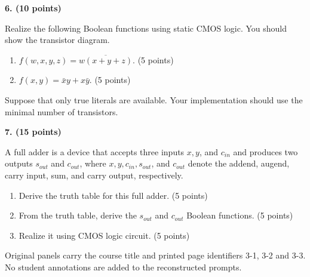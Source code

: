\documentclass[10pt]{article}
\newcommand{\qheading}[1]{\par\medskip\textbf{#1}\par}
\begin{document}
\newpage
\qheading{6. (10 points)} Realize the following Boolean functions using static CMOS logic. You should show the transistor diagram.
\begin{enumerate}[label=(\alph*),leftmargin=7mm]
\item $f(w,x,y,z)=\overline{w(x+y+z)}$. (5 points)
\item $f(x,y)=\bar xy+x\bar y$. (5 points)
\end{enumerate}
Suppose that only true literals are available. Your implementation should use the minimal number of transistors.
\qheading{7. (15 points)} A full adder is a device that accepts three inputs $x,y$, and $c_{in}$ and produces two outputs $s_{out}$ and $c_{out}$, where $x,y,c_{in},s_{out}$, and $c_{out}$ denote the addend, augend, carry input, sum, and carry output, respectively.
\begin{enumerate}[label=(\alph*),leftmargin=7mm]
\item Derive the truth table for this full adder. (5 points)
\item From the truth table, derive the $s_{out}$ and $c_{out}$ Boolean functions. (5 points)
\item Realize it using CMOS logic circuit. (5 points)
\end{enumerate}
\vfill\small Original panels carry the course title and printed page identifiers 3-1, 3-2 and 3-3. No student annotations are added to the reconstructed prompts.
\end{document}
